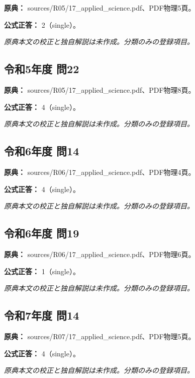 \noindent\textbf{原典：} sources/R05/17\_applied\_science.pdf、PDF物理5頁。

\textbf{公式正答：} 2（single）。

\par\textit{原典本文の校正と独自解説は未作成。分類のみの登録項目。}

\subsection{令和5年度 問22}
\label{q:r05-reg-applied-22}

\noindent\textbf{原典：} sources/R05/17\_applied\_science.pdf、PDF物理8頁。

\textbf{公式正答：} 4（single）。

\par\textit{原典本文の校正と独自解説は未作成。分類のみの登録項目。}

\subsection{令和6年度 問14}
\label{q:r06-reg-applied-14}

\noindent\textbf{原典：} sources/R06/17\_applied\_science.pdf、PDF物理4頁。

\textbf{公式正答：} 4（single）。

\par\textit{原典本文の校正と独自解説は未作成。分類のみの登録項目。}

\subsection{令和6年度 問19}
\label{q:r06-reg-applied-19}

\noindent\textbf{原典：} sources/R06/17\_applied\_science.pdf、PDF物理6頁。

\textbf{公式正答：} 1（single）。

\par\textit{原典本文の校正と独自解説は未作成。分類のみの登録項目。}

\subsection{令和7年度 問14}
\label{q:r07-reg-applied-14}

\noindent\textbf{原典：} sources/R07/17\_applied\_science.pdf、PDF物理5頁。

\textbf{公式正答：} 4（single）。

\par\textit{原典本文の校正と独自解説は未作成。分類のみの登録項目。}
